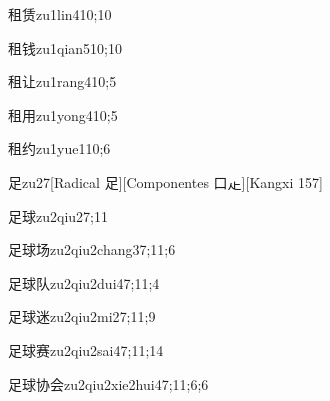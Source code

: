 \begin{verbete}{租赁}{zu1lin4}{10;10}
\end{verbete}

\begin{verbete}{租钱}{zu1qian5}{10;10}
\end{verbete}

\begin{verbete}{租让}{zu1rang4}{10;5}
\end{verbete}

\begin{verbete}{租用}{zu1yong4}{10;5}
\end{verbete}

\begin{verbete}{租约}{zu1yue1}{10;6}
\end{verbete}

\begin{verbete}{足}{zu2}{7}[Radical 足][Componentes 口龰][Kangxi 157]
\end{verbete}

\begin{verbete}{足球}{zu2qiu2}{7;11}
\end{verbete}

\begin{verbete}{足球场}{zu2qiu2chang3}{7;11;6}
\end{verbete}

\begin{verbete}{足球队}{zu2qiu2dui4}{7;11;4}
\end{verbete}

\begin{verbete}{足球迷}{zu2qiu2mi2}{7;11;9}
\end{verbete}

\begin{verbete}{足球赛}{zu2qiu2sai4}{7;11;14}
\end{verbete}

\begin{verbete}{足球协会}{zu2qiu2xie2hui4}{7;11;6;6}
\end{verbete}


